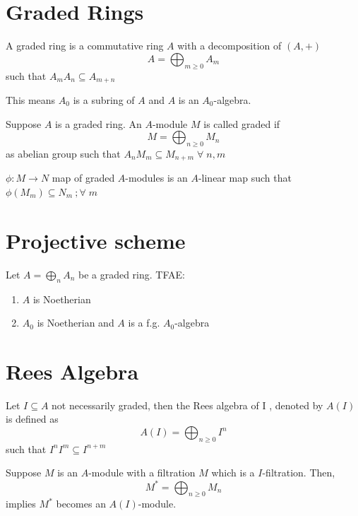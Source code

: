 \documentclass[oneside, 12pt]{scrbook}
\theoremstyle{theorem}
\begin{document}
\section{Graded Rings}
\begin{definition}
A graded ring is a commutative ring $A$ with a decomposition of $(A,+)$ $$A = \bigoplus_{m \geq 0}A_{m}$$ such that $A_{m}A_{n} \subseteq A_{m+n}$
\end{definition}
This means $A_{0}$ is a subring of $A$ and $A$ is an $A_{0}$-algebra.\\


\begin{definition}
Suppose $A$ is a graded ring. An $A$-module $M$ is called graded if $$M=\bigoplus_{n \geq 0} M_{n}$$ as abelian group such that $A_{n}M_{m} \subseteq M_{n+m} \; \forall \; n,m$ 
\end{definition}

\begin{definition}
$\phi : M \rightarrow N$ map of graded $A$-modules is an $A$-linear map such that $\phi(M_{m}) \subseteq N_{m} \ ; \forall \; m$
\end{definition}

\section{Projective scheme}

\begin{theorem}
Let $A = \bigoplus_{n} A_{n}$ be a graded ring. TFAE: 
\begin{enumerate}
\item $A$ is Noetherian
\item $A_{0}$ is Noetherian and $A$ is a f.g. $A_{0}$-algebra
\end{enumerate}
\end{theorem}

\section{Rees Algebra}

\begin{definition}
Let $I \subseteq A$ not necessarily graded, then the Rees algebra of I , denoted by $A(I)$ is defined as $$A(I) = \bigoplus_{n \geq 0} I^n$$ such that $I^nI^m \subseteq I^{n+m}$
\end{definition}
Suppose $M$ is an $A$-module with a filtration $M$ which is a $I$-filtration. Then, $$M^{*}  =\bigoplus_{n\geq 0} M_{n}$$ implies $M^*$ becomes an $A(I)$-module.
\end{document}
